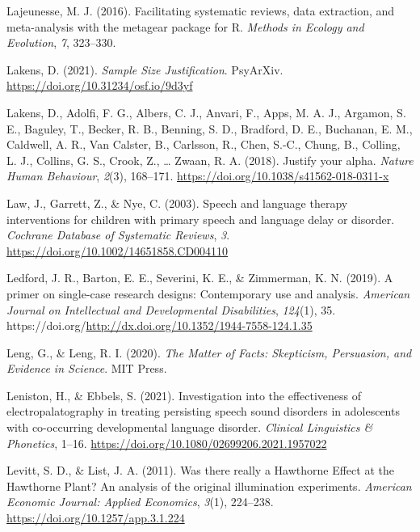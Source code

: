 \documentclass{krantz}
\newlength{\cslhangindent}
\newlength{\cslentryspacingunit} %
\newenvironment{CSLReferences}[2] %
{%
\setlength{\parindent}{0pt}
\ifodd #1
\let\oldpar\par
\def\par{\hangindent=\cslhangindent\oldpar}
\fi
\setlength{\parskip}{#2\cslentryspacingunit}
}%
{}
\begin{document}
\begin{CSLReferences}{1}{0}
\leavevmode{}%
Lajeunesse, M. J. (2016). Facilitating systematic reviews, data extraction, and meta-analysis with the metagear package for R. \emph{Methods in Ecology and Evolution}, \emph{7}, 323--330.

\leavevmode{}%
Lakens, D. (2021). \emph{Sample {Size Justification}}. {PsyArXiv}. \url{https://doi.org/10.31234/osf.io/9d3yf}

\leavevmode{}%
Lakens, D., Adolfi, F. G., Albers, C. J., Anvari, F., Apps, M. A. J., Argamon, S. E., Baguley, T., Becker, R. B., Benning, S. D., Bradford, D. E., Buchanan, E. M., Caldwell, A. R., Van Calster, B., Carlsson, R., Chen, S.-C., Chung, B., Colling, L. J., Collins, G. S., Crook, Z., \ldots{} Zwaan, R. A. (2018). Justify your alpha. \emph{Nature Human Behaviour}, \emph{2}(3), 168--171. \url{https://doi.org/10.1038/s41562-018-0311-x}

\leavevmode{}%
Law, J., Garrett, Z., \& Nye, C. (2003). Speech and language therapy interventions for children with primary speech and language delay or disorder. \emph{Cochrane Database of Systematic Reviews}, \emph{3}. \url{https://doi.org/10.1002/14651858.CD004110}

\leavevmode{}%
Ledford, J. R., Barton, E. E., Severini, K. E., \& Zimmerman, K. N. (2019). A primer on single-case research designs: {Contemporary} use and analysis. \emph{American Journal on Intellectual and Developmental Disabilities}, \emph{124}(1), 35. https://doi.org/\url{http://dx.doi.org/10.1352/1944-7558-124.1.35}

\leavevmode{}%
Leng, G., \& Leng, R. I. (2020). \emph{The {Matter} of {Facts}: {Skepticism}, {Persuasion}, and {Evidence} in {Science}}. {MIT Press}.

\leavevmode{}%
Leniston, H., \& Ebbels, S. (2021). Investigation into the effectiveness of electropalatography in treating persisting speech sound disorders in adolescents with co-occurring developmental language disorder. \emph{Clinical Linguistics \& Phonetics}, 1--16. \url{https://doi.org/10.1080/02699206.2021.1957022}

\leavevmode{}%
Levitt, S. D., \& List, J. A. (2011). Was there really a {Hawthorne Effect} at the {Hawthorne Plant}? {An} analysis of the original illumination experiments. \emph{American Economic Journal: Applied Economics}, \emph{3}(1), 224--238. \url{https://doi.org/10.1257/app.3.1.224}


\end{CSLReferences}
\end{document}
